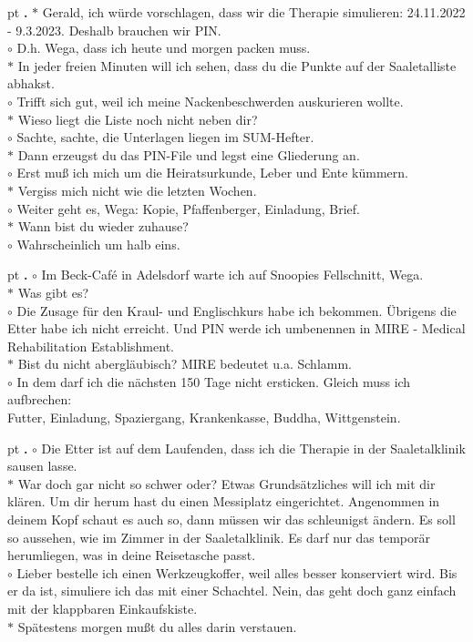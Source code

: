 \documentclass[10pt,a4paper]{article}
\newcounter{notec}
\newcommand\notep[1]{%
  \stepcounter{notec}
  \vskip #1pt
  {\bf\arabic{notec}.}
}
\begin{document}
\begin{mdframed}[style=daystyle]
  \notep 4 $\ast$ Gerald, ich würde vorschlagen, dass wir die Therapie
  simulieren: 24.11.2022 - 9.3.2023. Deshalb brauchen wir PIN. \\
  $\circ$ D.h. Wega, dass ich heute und morgen packen muss. \\
  $\ast$ In jeder freien Minuten will ich sehen, dass du die Punkte auf der
  Saaletalliste abhakst. \\
  $\circ$ Trifft sich gut, weil ich meine Nackenbeschwerden auskurieren wollte. \\
  $\ast$ Wieso liegt die Liste noch nicht neben dir? \\
  $\circ$ Sachte, sachte, die Unterlagen liegen im SUM-Hefter. \\
  $\ast$ Dann erzeugst du das PIN-File und legst eine Gliederung an. \\
  $\circ$ Erst muß ich mich um die Heiratsurkunde, Leber und Ente kümmern. \\
  $\ast$ Vergiss mich nicht wie die letzten Wochen. \\
  $\circ$ Weiter geht es, Wega: Kopie, Pfaffenberger, Einladung, Brief. \\
  $\ast$ Wann bist du wieder zuhause? \\
  $\circ$ Wahrscheinlich um halb eins.
  
  \notep 4 $\circ$ Im Beck-Café in Adelsdorf warte ich auf Snoopies Fellschnitt,
  Wega. \\
  $\ast$ Was gibt es? \\
  $\circ$ Die Zusage für den Kraul- und Englischkurs habe ich bekommen. Übrigens
  die Etter habe ich nicht erreicht. Und PIN werde ich umbenennen in MIRE
  - Medical Rehabilitation Establishment. \\
  $\ast$ Bist du nicht abergläubisch? MIRE bedeutet u.a. Schlamm. \\
  $\circ$ In dem darf ich die nächsten 150 Tage nicht ersticken. Gleich muss ich
  aufbrechen: \\
  Futter, Einladung, Spaziergang, Krankenkasse, Buddha, Wittgenstein.

  \notep 4 $\circ$ Die Etter ist auf dem Laufenden, dass ich die Therapie in der
  Saaletalklinik sausen lasse. \\
  $\ast$ War doch gar nicht so schwer oder? Etwas Grundsätzliches will ich mit
  dir klären. Um dir herum hast du einen Messiplatz eingerichtet. Angenommen in
  deinem Kopf schaut es auch so, dann müssen wir das schleunigst ändern. Es soll
  so aussehen, wie im Zimmer in der Saaletalklinik. Es darf nur das temporär
  herumliegen, was in deine Reisetasche passt. \\
  $\circ$ Lieber bestelle ich einen Werkzeugkoffer, weil alles besser
  konserviert wird. Bis er da ist, simuliere ich das mit einer Schachtel. Nein,
  das geht doch ganz einfach mit der klappbaren Einkaufskiste. \\
  $\ast$ Spätestens morgen mußt du alles darin verstauen.
  

\end{mdframed}
\end{document}

